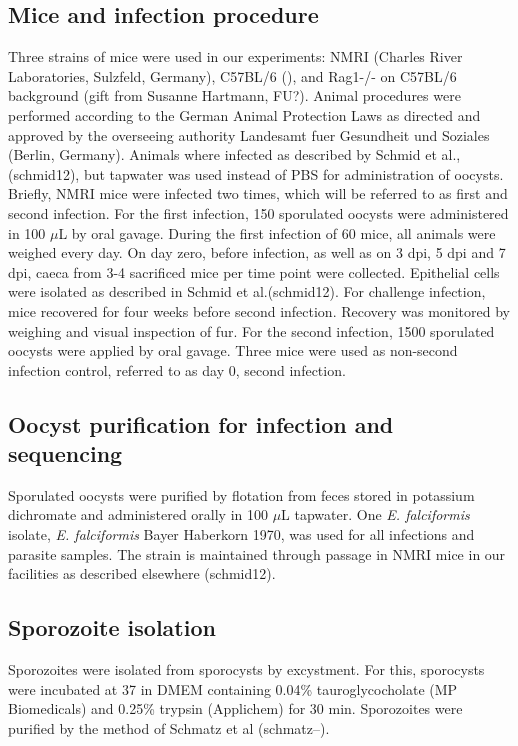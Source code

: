 \documentclass{bmcart}
\begin{document}
\subsection*{Mice and infection procedure}
Three strains of mice were used in our experiments: NMRI (Charles
River Laboratories, Sulzfeld, Germany), C57BL/6 (), and Rag1-/- on
C57BL/6 background (gift from Susanne Hartmann, FU?).  Animal
procedures were performed according to the German Animal Protection
Laws as directed and approved by the overseeing authority Landesamt
fuer Gesundheit und Soziales (Berlin, Germany). Animals where infected
as described by Schmid et al., (schmid12), but tapwater was used
instead of PBS for administration of oocysts. Briefly, NMRI mice were
infected two times, which will be referred to as first and second
infection. For the first infection, 150 sporulated oocysts were
administered in 100 $\mu$L by oral gavage. During the first infection of
60 mice, all animals were weighed every day. On day zero, before
infection, as well as on 3 dpi, 5 dpi and 7 dpi, caeca from 3-4 sacrificed mice per time point were
collected. Epithelial cells were isolated as described in Schmid et
al.(schmid12). For challenge infection, mice recovered for four weeks
before second infection.  Recovery was monitored by weighing and
visual inspection of fur. For the second infection, 1500 sporulated
oocysts were applied by oral gavage. Three mice were used as
non-second infection control, referred to as day 0, second infection.

\subsection*{Oocyst purification for infection and sequencing}
Sporulated oocysts were purified by flotation from feces stored in
potassium dichromate and administered orally in 100 $\mu$L tapwater. One
\textit{E. falciformis} isolate, \textit{E. falciformis} Bayer
Haberkorn 1970, was used for all infections and parasite samples. The
strain is maintained through passage in NMRI mice in our facilities as
described elsewhere (schmid12).

\subsection*{Sporozoite isolation}
Sporozoites were isolated from sporocysts by excystment. For this,
sporocysts were incubated at 37\newcommand{\degree}C in DMEM containing 0.04\%
tauroglycocholate (MP Biomedicals) and 0.25\% trypsin (Applichem) for
30 min. Sporozoites were purified by the method of Schmatz et al
(schmatz--).
\end{document}
